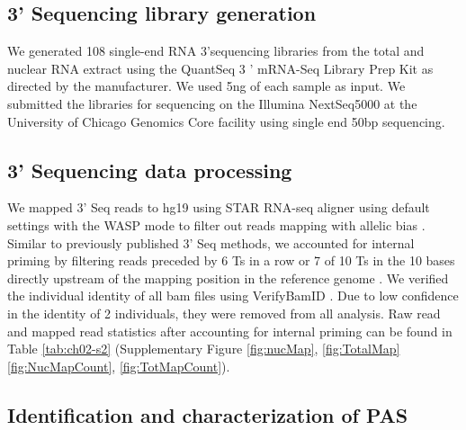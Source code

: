 \subsection{3' Sequencing library generation}\label{three-Sequencing-library-generation}

We generated 108 single-end RNA 3'sequencing libraries from the total and nuclear RNA extract using the QuantSeq 3 ' mRNA-Seq Library Prep Kit \citep{moll_quantseq_2014} as directed by the manufacturer. We used 5ng of each sample as input. We submitted the libraries for sequencing on the Illumina NextSeq5000 at the University of Chicago Genomics Core facility using single end 50bp sequencing. 

\subsection{3' Sequencing data processing}\label{three-Sequencing data processing}

We mapped 3'  Seq reads to hg19 \citep{church_modernizing_2011} using STAR RNA-seq aligner \citep{dobin_star_2013} using default settings with the WASP mode to filter out reads mapping with allelic bias \citep{van_de_geijn_wasp_2015}. Similar to previously published 3'  Seq methods, we accounted for internal priming by filtering reads preceded by 6 Ts in a row or 7 of 10 Ts in the 10 bases directly upstream of the mapping position in the reference genome \citep{tian_large-scale_2005, sheppard_accurate_2013, beaudoing_patterns_2000}. We verified the individual identity of all bam files using VerifyBamID \citep{jun_detecting_2012}. Due to low confidence in the identity of 2 individuals, they were removed from all analysis. Raw read and mapped read statistics after accounting for internal priming can be found in Table \ref{tab:ch02-s2} (Supplementary Figure \ref{fig:nucMap}, \ref{fig:TotalMap} \ref{fig:NucMapCount}, \ref{fig:TotMapCount}).

\subsection{Identification and characterization of PAS}\label{Identification-and-characerization-of-PAS}

